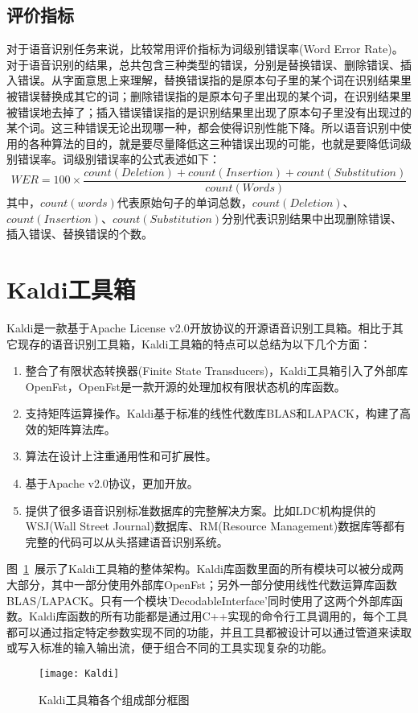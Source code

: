 \subsection{评价指标}
对于语音识别任务来说，比较常用评价指标为词级别错误率(Word Error Rate)。对于语音识别的结果，总共包含三种类型的错误，分别是替换错误、删除错误、插入错误。从字面意思上来理解，替换错误指的是原本句子里的某个词在识别结果里被错误替换成其它的词；删除错误指的是原本句子里出现的某个词，在识别结果里被错误地去掉了；插入错误错误指的是识别结果里出现了原本句子里没有出现过的某个词。这三种错误无论出现哪一种，都会使得识别性能下降。所以语音识别中使用的各种算法的目的，就是要尽量降低这三种错误出现的可能，也就是要降低词级别错误率。词级别错误率的公式表述如下：
\begin{equation}WER=100\times\frac{count(Deletion)+count(Insertion)+count(Substitution)}{count(Words)}\end{equation}
其中，$count(words)$代表原始句子的单词总数，$count(Deletion)$、$count(Insertion)$、$count(Substitution)$分别代表识别结果中出现删除错误、插入错误、替换错误的个数。
\section{Kaldi工具箱}
Kaldi是一款基于Apache License v2.0开放协议的开源语音识别工具箱。相比于其它现存的语音识别工具箱，Kaldi工具箱的特点可以总结为以下几个方面：
\begin{enumerate}
  \item 整合了有限状态转换器(Finite State Transducers)，Kaldi工具箱引入了外部库OpenFst\cite{allauzen2007openfst}，OpenFst是一款开源的处理加权有限状态机的库函数。
  \item 支持矩阵运算操作。Kaldi基于标准的线性代数库BLAS和LAPACK，构建了高效的矩阵算法库。
  \item 算法在设计上注重通用性和可扩展性。
  \item 基于Apache v2.0协议，更加开放。
  \item 提供了很多语音识别标准数据库的完整解决方案。比如LDC机构提供的WSJ(Wall Street Journal)数据库、RM(Resource Management)数据库等都有完整的代码可以从头搭建语音识别系统。
\end{enumerate}

图~\ref{fig:Kaldi}~展示了Kaldi工具箱的整体架构。Kaldi库函数里面的所有模块可以被分成两大部分，其中一部分使用外部库OpenFst；另外一部分使用线性代数运算库函数BLAS/LAPACK。只有一个模块'DecodableInterface'同时使用了这两个外部库函数。Kaldi库函数的所有功能都是通过用C++实现的命令行工具调用的，每个工具都可以通过指定特定参数实现不同的功能，并且工具都被设计可以通过管道来读取或写入标准的输入输出流，便于组合不同的工具实现复杂的功能。
\begin{figure}[htbp]
\centering
\texttt{[image: Kaldi]}
\caption{Kaldi工具箱各个组成部分框图}\label{fig:Kaldi}
\vspace{\baselineskip}
\end{figure}

